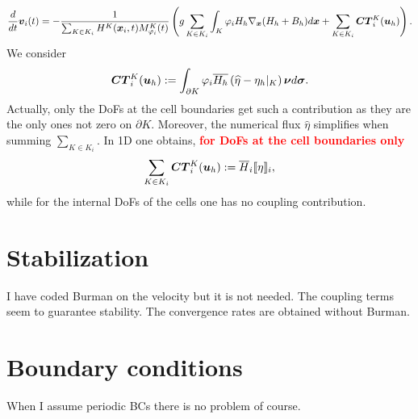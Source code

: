 \documentclass[english]{article}
\theoremstyle{thmstyleone}
\theoremstyle{thmstyletwo}
\theoremstyle{thmstylethree}
\newcommand{\uapp}[0]{\uvec{u}_h}
\newcommand{\uvec}[2][3]{\boldsymbol{#2\mkern-#1mu}\mkern#1mu}
\begin{document}
\begin{equation}
	\frac{d}{dt}\uvec{v}_i(t)=-\frac{1}{\sum_{K \in K_i} H^K(\uvec{x}_i,t) M^K_{\varphi_i}(t)}\left(g \sum_{K \in K_i} \int_K \varphi_i H_h\nabla_{\uvec{x}}(H_h+B_h)  d\uvec{x} + \sum_{K \in K_i}\uvec{CT}^K_i(\uvec{u}_h) \right).
\end{equation}
We consider
\begin{align}
\begin{split}
\uvec{CT}^K_i(\uvec{u}_h):=\int_{\partial K} \varphi_i \overline{H_h} \left( \widehat{\eta}-\eta_h\vert_K \right) \uvec{\nu} d \uvec{\sigma}.
\end{split}
\label{eq:CT}
\end{align}
Actually, only the DoFs at the cell boundaries get such a contribution as they are the only ones not zero on $\partial K$. Moreover, the numerical flux $\widehat{\eta}$ simplifies when summing $\sum_{K \in K_i}$. In 1D one obtains, \textcolor{red}{\textbf{for DoFs at the cell boundaries only}}
\begin{align}
	\begin{split}
		\sum_{K \in K_i}\uvec{CT}^K_i(\uvec{u}_h) := \overline{H}_i \llbracket \eta \rrbracket_i,
	\end{split}
	\label{eq:CT1D}
\end{align}
while for the  internal DoFs of the cells one has no coupling contribution.




\section{Stabilization}

I have coded Burman on the velocity but it is not needed.
The coupling terms seem to guarantee stability.
The convergence rates are obtained without Burman.


\section{Boundary conditions}
When I assume periodic BCs there is no problem of course.
\end{document}
